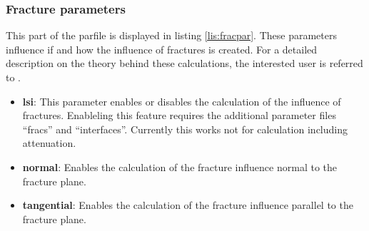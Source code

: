 		\subsubsection{Fracture parameters}
			This part of the parfile is displayed in listing \ref{lis:fracpar}. These parameters influence if and how the influence of fractures is created. For a detailed description on the theory behind these calculations, the interested user is referred to \cite{Moeller.2018}.
			 
    		\begin{itemize}
    			\item \textbf{lsi}: This parameter enables or disables the calculation of the influence of fractures. Enableling this feature requires the additional parameter files ``fracs'' and ``interfaces''. Currently this works not for calculation including attenuation.
    			\item \textbf{normal}: Enables the calculation of the fracture influence normal to the fracture plane.
    			\item \textbf{tangential}: Enables the calculation of the fracture influence parallel to the fracture plane.
    		\end{itemize}  
    		  		

